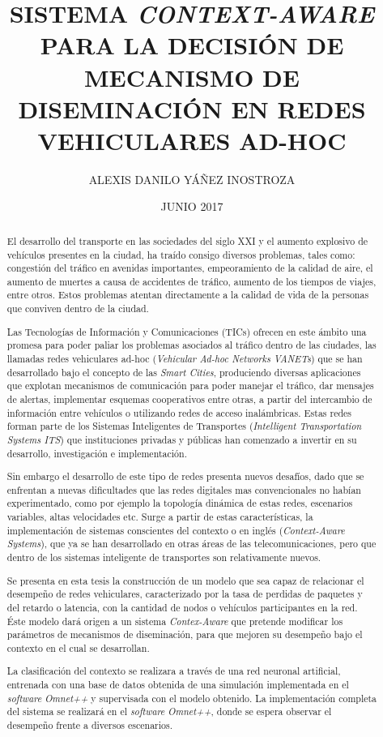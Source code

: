 \documentclass[upright, contnum]{umemoria}
\author{ALEXIS DANILO YÁÑEZ INOSTROZA}
\title{SISTEMA \textit{CONTEXT-AWARE} PARA LA DECISIÓN DE MECANISMO DE DISEMINACIÓN EN REDES VEHICULARES AD-HOC}
\date{JUNIO 2017}
\begin{document}
\frontmatter
\maketitle

\begin{abstract}

El desarrollo del transporte en las sociedades del siglo XXI y el aumento explosivo de vehículos presentes en la ciudad, ha traído consigo diversos problemas, tales como: congestión del tráfico en avenidas importantes, empeoramiento de la calidad de aire, el aumento de muertes a causa de accidentes de tráfico, aumento de los tiempos de viajes, entre otros. Estos problemas atentan directamente a la calidad de vida de la personas que conviven dentro de la ciudad.

Las Tecnologías de Información y Comunicaciones (TICs) ofrecen en este ámbito una promesa para poder paliar los problemas asociados al tráfico dentro de las ciudades, las llamadas redes vehiculares ad-hoc (\textit{Vehicular Ad-hoc Networks VANETs}) que se han desarrollado bajo el concepto de las \textit{Smart Cities}, produciendo diversas aplicaciones que explotan mecanismos de comunicación para poder manejar el tráfico, dar mensajes de alertas, implementar esquemas cooperativos entre otras, a partir del intercambio de información entre vehículos o utilizando redes de acceso inalámbricas. Estas redes forman parte de los Sistemas Inteligentes de Transportes (\textit{Intelligent Transportation Systems ITS}) que instituciones privadas y públicas han comenzado a invertir en su desarrollo, investigación e implementación.

Sin embargo el desarrollo de este tipo de redes presenta nuevos desafíos, dado que se enfrentan a nuevas dificultades que las redes digitales mas convencionales no habían experimentado, como por ejemplo la topología dinámica de estas redes, escenarios variables, altas velocidades etc. Surge a partir de estas características, la implementación de sistemas conscientes del contexto o en inglés (\textit{Context-Aware Systems}), que ya se han desarrollado en otras áreas de las telecomunicaciones, pero que dentro de los sistemas inteligente de transportes son relativamente nuevos. 

Se presenta en esta tesis la construcción de un modelo que sea capaz de relacionar el desempeño de redes vehiculares, caracterizado por la tasa de perdidas de paquetes y del retardo o latencia, con la cantidad de nodos o vehículos participantes en la red. Éste modelo dará origen a un sistema \textit{Contex-Aware} que pretende modificar los parámetros de mecanismos de diseminación, para que mejoren su desempeño bajo el contexto en el cual se desarrollan. 

La clasificación del contexto se realizara a través de una red neuronal artificial, entrenada con una base de datos obtenida de una simulación implementada en el \textit{software} \textit{Omnet++} y supervisada con el modelo obtenido. La implementación completa del sistema se realizará en el \textit{software} \textit{Omnet++}, donde se espera observar el desempeño frente a diversos escenarios.

\end{abstract}
\end{document}
